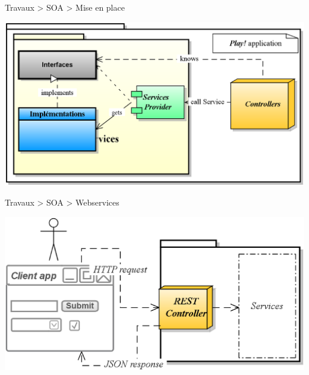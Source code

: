 \documentclass[HeilHazel,pdf,final,colorBG,slideColor]{prosper}
\begin{document}
\begin{slide}{Travaux > SOA > Mise en place}

  \bc{} 
    \includegraphics[scale=.3]{img/SOA_impl.eps} 
  \ec{}

\end{slide}

\begin{slide}{Travaux > SOA > Webservices}

  \bc{} 
    \includegraphics[scale=.4]{img/SOA_WS.eps} 
  \ec{}

\end{slide}
\end{document}
